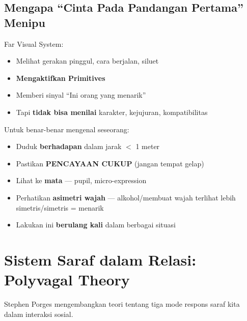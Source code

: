 \subsection{Mengapa ``Cinta Pada Pandangan Pertama'' Menipu}

Far Visual System:
\begin{itemize}
    \item Melihat gerakan pinggul, cara berjalan, siluet
    \item \textbf{Mengaktifkan Primitives}
    \item Memberi sinyal ``Ini orang yang menarik''
    \item Tapi \textbf{tidak bisa menilai} karakter, kejujuran, kompatibilitas
\end{itemize}

\begin{tipbox}
Untuk benar-benar mengenal seseorang:
\begin{itemize}
    \item Duduk \textbf{berhadapan} dalam jarak $<$ 1 meter
    \item Pastikan \textbf{PENCAYAAN CUKUP} (jangan tempat gelap)
    \item Lihat ke \textbf{mata} --- pupil, micro-expression
    \item Perhatikan \textbf{asimetri wajah} --- alkohol/membuat wajah terlihat lebih simetris/simetris = menarik
    \item Lakukan ini \textbf{berulang kali} dalam berbagai situasi
\end{itemize}
\end{tipbox}

\section{Sistem Saraf dalam Relasi: Polyvagal Theory}

Stephen Porges mengembangkan teori tentang tiga mode respons saraf kita dalam interaksi sosial.

